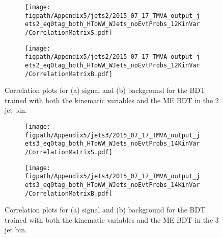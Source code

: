 \begin{figure}[!hbt]
    \centering
    \begin{subfigure}[t]{0.48\textwidth}
        \texttt{[image: \\figpath/Appendix5/jets2/2015\_07\_17\_TMVA\_output\_jets2\_eq0tag\_both\_HToWW\_WJets\_noEvtProbs\_12KinVar/CorrelationMatrixS.pdf]}
        \caption{}
        \label{fig:KinMEBDT_jets2_CorrelationS}
    \end{subfigure}
    \begin{subfigure}[t]{0.48\textwidth}
        \texttt{[image: \\figpath/Appendix5/jets2/2015\_07\_17\_TMVA\_output\_jets2\_eq0tag\_both\_HToWW\_WJets\_noEvtProbs\_12KinVar/CorrelationMatrixB.pdf]}
        \caption{}
        \label{fig:KinMEBDT_jets2_CorrelationB}
    \end{subfigure}
    \caption{Correlation plots for (a) signal and (b) background for the BDT trained with both the kinematic variables and the ME BDT in the 2 jet bin.}
    \label{fig:KinMEBDT_jets2_Correlations}
\end{figure}

\begin{figure}[!hbt]
    \centering
    \begin{subfigure}[t]{0.48\textwidth}
        \texttt{[image: \\figpath/Appendix5/jets3/2015\_07\_17\_TMVA\_output\_jets3\_eq0tag\_both\_HToWW\_WJets\_noEvtProbs\_14KinVar/CorrelationMatrixS.pdf]}
        \caption{}
        \label{fig:KinMEBDT_jets3_CorrelationS}
    \end{subfigure}
    \begin{subfigure}[t]{0.48\textwidth}
        \texttt{[image: \\figpath/Appendix5/jets3/2015\_07\_17\_TMVA\_output\_jets3\_eq0tag\_both\_HToWW\_WJets\_noEvtProbs\_14KinVar/CorrelationMatrixB.pdf]}
        \caption{}
        \label{fig:KinMEBDT_jets3_CorrelationB}
    \end{subfigure}
    \caption{Correlation plots for (a) signal and (b) background for the BDT trained with both the kinematic variables and the ME BDT in the 3 jet bin.}
    \label{fig:KinMEBDT_jets3_Correlations}
\end{figure}

